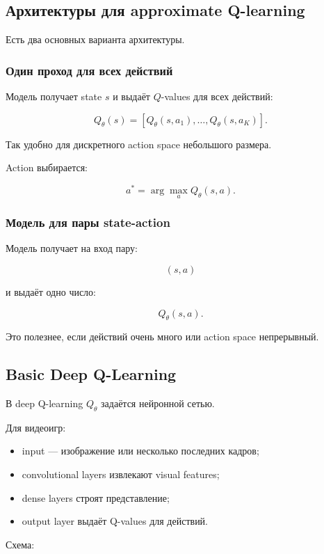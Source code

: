 \documentclass[a4paper,12pt]{article}
\begin{document}
\subsection{Архитектуры для approximate Q-learning}

Есть два основных варианта архитектуры.

\subsubsection{Один проход для всех действий}

Модель получает state \(s\) и выдаёт \(Q\)-values для всех действий:

\[
Q_\theta(s)
=
[
Q_\theta(s,a_1),
\dots,
Q_\theta(s,a_K)
].
\]

Так удобно для дискретного action space небольшого размера.

Action выбирается:

\[
a^*
=
\arg\max_a Q_\theta(s,a).
\]

\subsubsection{Модель для пары state-action}

Модель получает на вход пару:

\[
(s,a)
\]

и выдаёт одно число:

\[
Q_\theta(s,a).
\]

Это полезнее, если действий очень много или action space непрерывный.

\subsection{Basic Deep Q-Learning}

В deep Q-learning \(Q_\theta\) задаётся нейронной сетью.

Для видеоигр:

\begin{itemize}
    \item input --- изображение или несколько последних кадров;
    \item convolutional layers извлекают visual features;
    \item dense layers строят представление;
    \item output layer выдаёт Q-values для действий.
\end{itemize}

Схема:
\end{document}
